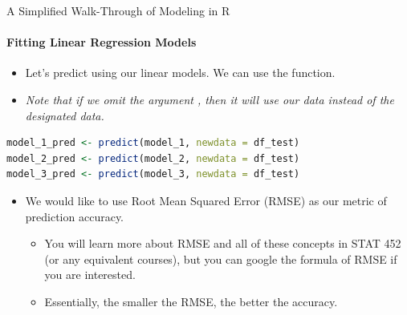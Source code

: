 \begin{frame}[fragile]{A Simplified Walk-Through of Modeling in R}
\framesubtitle{Fitting Linear Regression Models}
\begin{itemize}
  \item Let’s predict using our linear models. We can use the  function.
  \item \textit{Note that if we omit the argument , then it will use our  data instead of the designated  data.}
\end{itemize}
\begin{lstlisting}[language=R]
model_1_pred <- predict(model_1, newdata = df_test)
model_2_pred <- predict(model_2, newdata = df_test)
model_3_pred <- predict(model_3, newdata = df_test)
\end{lstlisting}
\begin{itemize}
  \item We would like to use Root Mean Squared Error (RMSE) as our metric of prediction accuracy.
  \begin{itemize}
    \item You will learn more about RMSE and all of these concepts in STAT 452 (or any equivalent courses), but you can google the formula of RMSE if you are interested.
    \item Essentially, the smaller the RMSE, the better the accuracy.
  \end{itemize}
\end{itemize}
\end{frame}

